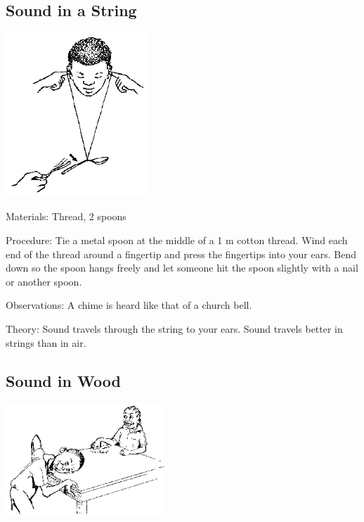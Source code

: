 \begin{multicols}{2}
\subsection{Sound in a String}

\begin{center}
\includegraphics[width=0.4\textwidth]{./img/source/sound-in-string.png}
\end{center}

\begin{description*}
\item[Materials:]{Thread, 2 spoons}
\item[Procedure:]{Tie a metal spoon at the middle of a 1 m cotton thread. Wind each end of the thread around a fingertip and press the fingertips into your ears. Bend down so the spoon hangs freely and let someone hit the spoon slightly with a nail or another spoon.}
\item[Observations:]{A chime is heard like that of a church bell.}
\item[Theory:]{Sound travels through the string to your ears. Sound travels better in strings than in air.}
\end{description*}

\subsection{Sound in Wood}

\begin{center}
\includegraphics[width=0.45\textwidth]{./img/source/sound-in-wood.png}
\end{center}


\end{multicols}
